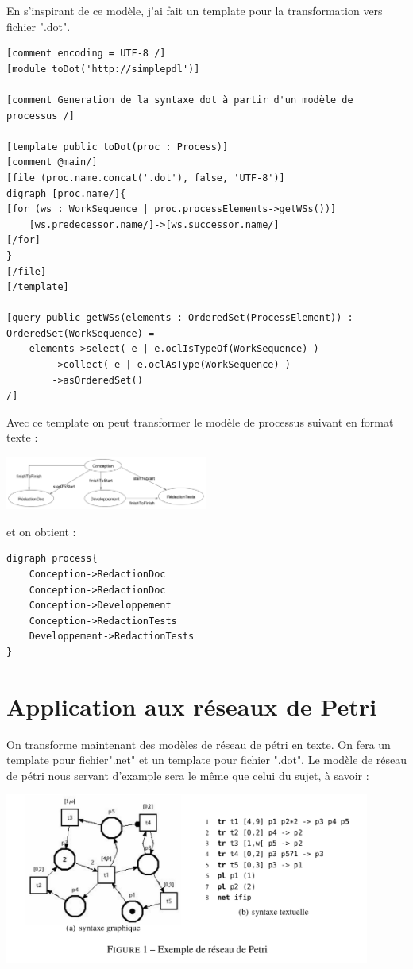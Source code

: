 En s'inspirant de ce modèle, j'ai fait un template pour la transformation vers fichier ".dot".

\begin{lstlisting}[caption=toDot.mtl]
[comment encoding = UTF-8 /]
[module toDot('http://simplepdl')]

[comment Generation de la syntaxe dot à partir d'un modèle de processus /]

[template public toDot(proc : Process)]
[comment @main/]
[file (proc.name.concat('.dot'), false, 'UTF-8')]
digraph [proc.name/]{
[for (ws : WorkSequence | proc.processElements->getWSs())]
	[ws.predecessor.name/]->[ws.successor.name/]
[/for]
}
[/file]
[/template]

[query public getWSs(elements : OrderedSet(ProcessElement)) : OrderedSet(WorkSequence) = 
	elements->select( e | e.oclIsTypeOf(WorkSequence) )
		->collect( e | e.oclAsType(WorkSequence) )
		->asOrderedSet()
/]
\end{lstlisting}

Avec ce template on peut transformer le modèle de processus suivant en format texte :

\begin{center}
\includegraphics[width = 0.5\textwidth]{../Images/tp2/tp2_2-1.png}
\end{center}

et on obtient :

\begin{lstlisting}[caption=process.dot]
digraph process{
	Conception->RedactionDoc
	Conception->RedactionDoc
	Conception->Developpement
	Conception->RedactionTests
	Developpement->RedactionTests
}
\end{lstlisting}

\section{Application aux réseaux de Petri}

On transforme maintenant des modèles de réseau de pétri en texte. On fera un template pour fichier".net" et un template pour fichier ".dot". Le modèle de réseau de pétri nous servant d'example sera le même que celui du sujet, à savoir :

\begin{center}
\includegraphics[width = 0.9\textwidth]{../Images/tp4/tp4_1.png}
\end{center}


